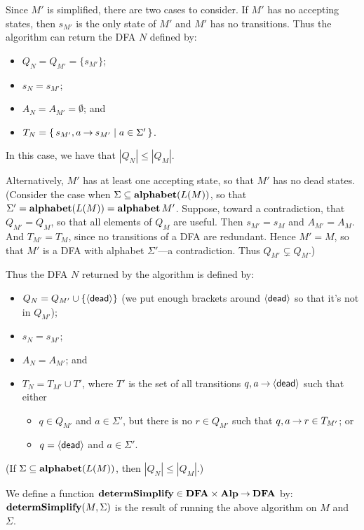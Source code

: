 Since $M'$ is simplified, there are two cases to consider.  If $M'$
has no accepting states, then $s_{M'}$ is the only state of $M'$ and
$M'$ has no transitions.  Thus the algorithm can return the DFA $N$
defined by:
\begin{itemize}
\item $Q_N=Q_{M'}=\{s_{M'}\}$;

\item $s_N=s_{M'}$;

\item $A_N=A_{M'}=\emptyset$; and

\item $T_N=\{ \, s_{M'},a\mathbin{\to} s_{M'} \mid a\in\Sigma' \, \}$.
\end{itemize}
In this case, we have that $|Q_N| \leq |Q_M|$.

Alternatively, $M'$ has at least one accepting state, so that $M'$ has
no dead states. (Consider the case when $\Sigma\subseteq\mathbf{alphabet}(L(M))$,
so that $\Sigma' = \mathbf{alphabet}(L(M)) = \mathbf{alphabet}\,M'$.  Suppose, toward
a contradiction, that $Q_{M'} = Q_M$, so that all elements of $Q_M$
are useful.  Then $s_{M'} = s_M$ and $A_{M'} = A_M$.  And
$T_{M'} = T_{M}$, since no transitions of a DFA are redundant. Hence
$M' = M$, so that $M'$ is a DFA with alphabet $\Sigma'$---a
contradiction. Thus $Q_{M'}\subsetneq Q_M$.)

Thus the DFA $N$ returned by the algorithm is defined by:
\begin{itemize}
\item $Q_N = Q_{M'}\cup\{\langle\mathsf{dead}\rangle\}$ (we put enough brackets around
$\langle\mathsf{dead}\rangle$ so that it's not in $Q_{M'}$);

\item $s_N=s_{M'}$;

\item $A_N=A_{M'}$; and

\item $T_N=T_{M'}\cup T'$, where $T'$ is the set of all transitions
  $q,a\mathbin{\to}\langle\mathsf{dead}\rangle$ such that either
\begin{itemize}
\item $q\in Q_{M'}$ and $a\in\Sigma'$, but there is no $r\in Q_{M'}$
  such that $q,a\mathbin{\to} r\in T_{M'}$; or

\item $q=\langle\mathsf{dead}\rangle$ and $a\in\Sigma'$.
\end{itemize}
\end{itemize}
(If $\Sigma\subseteq\mathbf{alphabet}(L(M))$, then $|Q_N|\leq |Q_M|$.)

We define a function $\mathbf{determSimplify}\in\mathbf{DFA}\times\mathbf{Alp}\mathbin{\to}\mathbf{DFA}$
by: $\mathbf{determSimplify}(M,\Sigma)$ is the result of
running the above algorithm on $M$ and $\Sigma$.

